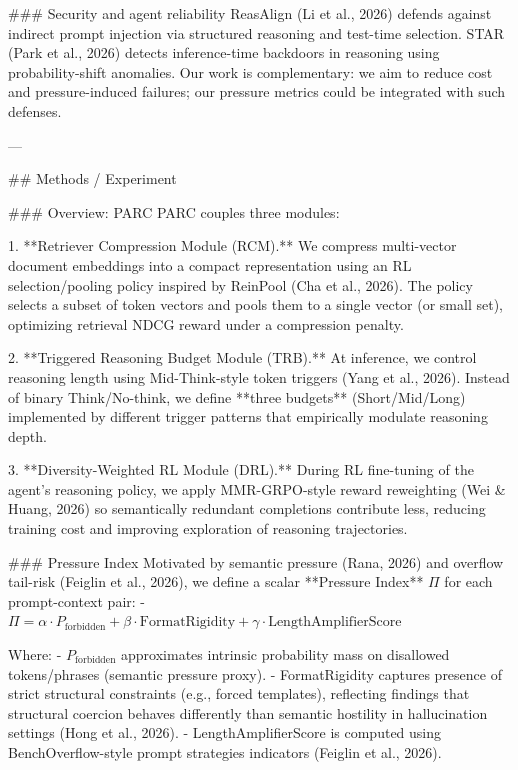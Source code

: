 ### Security and agent reliability  
ReasAlign (Li et al., 2026) defends against indirect prompt injection via structured reasoning and test-time selection. STAR (Park et al., 2026) detects inference-time backdoors in reasoning using probability-shift anomalies. Our work is complementary: we aim to reduce cost and pressure-induced failures; our pressure metrics could be integrated with such defenses.

---

## Methods / Experiment  

### Overview: PARC  
PARC couples three modules:

1. **Retriever Compression Module (RCM).**  
   We compress multi-vector document embeddings into a compact representation using an RL selection/pooling policy inspired by ReinPool (Cha et al., 2026). The policy selects a subset of token vectors and pools them to a single vector (or small set), optimizing retrieval NDCG reward under a compression penalty.

2. **Triggered Reasoning Budget Module (TRB).**  
   At inference, we control reasoning length using Mid-Think-style token triggers (Yang et al., 2026). Instead of binary Think/No-think, we define **three budgets** (Short/Mid/Long) implemented by different trigger patterns that empirically modulate reasoning depth.

3. **Diversity-Weighted RL Module (DRL).**  
   During RL fine-tuning of the agent’s reasoning policy, we apply MMR-GRPO-style reward reweighting (Wei & Huang, 2026) so semantically redundant completions contribute less, reducing training cost and improving exploration of reasoning trajectories.

### Pressure Index  
Motivated by semantic pressure (Rana, 2026) and overflow tail-risk (Feiglin et al., 2026), we define a scalar **Pressure Index** \( \Pi \) for each prompt-context pair:
- \( \Pi = \alpha \cdot P_{\text{forbidden}} + \beta \cdot \text{FormatRigidity} + \gamma \cdot \text{LengthAmplifierScore} \)

Where:
- \(P_{\text{forbidden}}\) approximates intrinsic probability mass on disallowed tokens/phrases (semantic pressure proxy).
- FormatRigidity captures presence of strict structural constraints (e.g., forced templates), reflecting findings that structural coercion behaves differently than semantic hostility in hallucination settings (Hong et al., 2026).
- LengthAmplifierScore is computed using BenchOverflow-style prompt strategies indicators (Feiglin et al., 2026).

